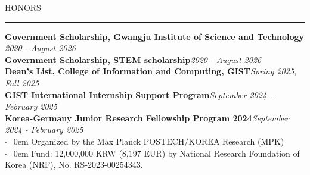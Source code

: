 \documentclass{resume} %
\renewenvironment{rSection}[1]{
\vspace{-0.5 em} %
\sectionskip
\textcolor{RoyalPurple}{\MakeUppercase{#1}}
\sectionlineskip
\hrule
\begin{list}{}{
\setlength{\leftmargin}{1.5em}
}
\item[]
}{
\end{list}
}
\begin{document}
\begin{rSection}{Honors} \itemsep -2pt
{\bf Government Scholarship, Gwangju Institute of Science and Technology }\hfill {\em 2020 - August 2026}\\
{\bf Government Scholarship, STEM scholarship}\hfill {\em 2020 - August 2026} \\
{\bf Dean's List, College of Information and Computing, GIST}\hfill {\em Spring 2025, Fall 2025} \\
{\bf GIST International Internship Support Program}\hfill {\em September 2024 - February 2025} \\
{\bf Korea-Germany Junior Research Fellowship Program 2024}\hfill {\em September 2024 - February 2025} \\
{$\cdot$}{\leftmargin=0em} Organized by the Max Planck POSTECH/KOREA Research (MPK) \\
{$\cdot$}{\leftmargin=0em} Fund: 12,000,000 KRW (8,197 EUR) by National Research Foundation of Korea (NRF), No. RS-2023-00254343. \\


\end{rSection}
\end{document}
